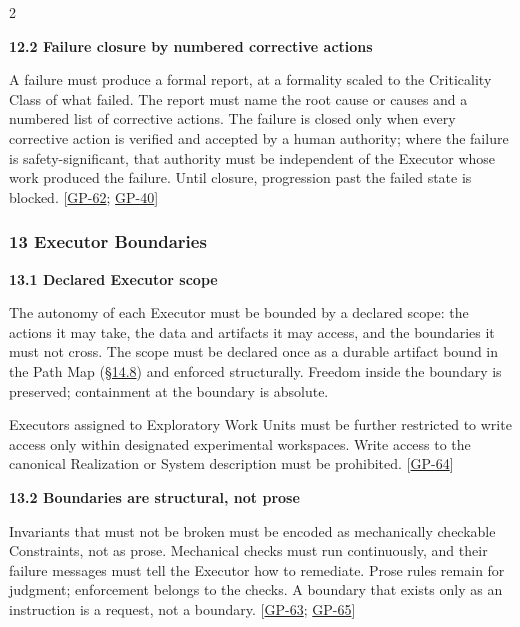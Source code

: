 \begin{multicols}{2}
\hypertarget{nss-12.2}{}

\par\smallskip\noindent\textbf{12.2 Failure closure by numbered corrective actions}\par\nopagebreak

A failure must produce a formal report, at a formality scaled to the Criticality Class of what failed. The report must name the root cause or causes and a numbered list of corrective actions. The failure is closed only when every corrective action is verified and accepted by a human authority; where the failure is safety-significant, that authority must be independent of the Executor whose work produced the failure. Until closure, progression past the failed state is blocked. [\hyperlink{gp-62}{GP-62}; \hyperlink{gp-40}{GP-40}]

\hypertarget{nss-13}{}

\subsubsection*{13 Executor Boundaries}

\hypertarget{nss-13.1}{}

\par\smallskip\noindent\textbf{13.1 Declared Executor scope}\par\nopagebreak

The autonomy of each Executor must be bounded by a declared scope: the actions it may take, the data and artifacts it may access, and the boundaries it must not cross. The scope must be declared once as a durable artifact bound in the Path Map (\hyperlink{nss-14.8}{\S14.8}) and enforced structurally. Freedom inside the boundary is preserved; containment at the boundary is absolute.

Executors assigned to Exploratory Work Units must be further restricted to write access only within designated experimental workspaces. Write access to the canonical Realization or System description must be prohibited. [\hyperlink{gp-64}{GP-64}]

\hypertarget{nss-13.2}{}

\par\smallskip\noindent\textbf{13.2 Boundaries are structural, not prose}\par\nopagebreak

Invariants that must not be broken must be encoded as mechanically checkable Constraints, not as prose. Mechanical checks must run continuously, and their failure messages must tell the Executor how to remediate. Prose rules remain for judgment; enforcement belongs to the checks. A boundary that exists only as an instruction is a request, not a boundary. [\hyperlink{gp-63}{GP-63}; \hyperlink{gp-65}{GP-65}]


\end{multicols}
